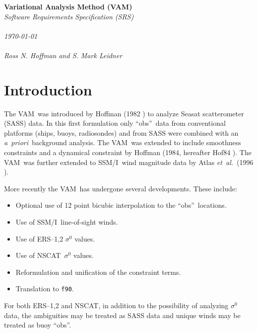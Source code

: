 \documentclass[11pt]{article}
\newcommand{\apriori}{{\em a~priori}}
\newcommand{\computer}[1]{{\tt #1}}
\newcommand{\ers}[1]{ERS--{#1}}
\newcommand{\etal}{{\em et~al.}}
\newcommand{\nscat}{NSCAT}
\newcommand{\obs}{``obs''}
\newcommand{\ssmi}{SSM/I}
\newcommand{\s}[1]{\mbox{$ \sigma^{#1} $}}
\newcommand{\vam}{VAM}
\newcommand{\xx}[1]{\section {#1}}
\newcommand{\reference}[2]{(#1 \cite{#2})}
\renewcommand{\apriori}{{\em a~priori}}
\begin{document}
\begin{center}
	      {\bf Variational Analysis Method (VAM)\\}
	   {\it Software Requirements Specification (SRS)\\ ~ \\
			       \today \\ ~ \\
	       Ross N. Hoffman and S. Mark Leidner\\ }
			     \vspace{2cm}
\end{center}

\xx {Introduction}

The \vam\ was introduced by Hoffman \reference{1982}{Hof82} to analyze
Seasat scatterometer (SASS) data.  In this first formulation only
\obs\ data from conventional platforms (ships, buoys, radiosondes) and
from SASS were combined with an \apriori\ background analysis.  The
\vam\ was extended to include smoothness constraints and a dynamical
constraint by Hoffman \reference{1984, hereafter Hof84}{Hof84}.  The
\vam\ was further extended to \ssmi\ wind magnitude data by Atlas \etal\
\reference{1996}{AtlHB+96}.

More recently the \vam\ has undergone several developments.  These
include:
 \begin{itemize}
  \item Optional use of 12 point bicubic interpolation to the \obs\ locations.
  \item Use of \ssmi\ line-of-sight winds.
  \item Use of \ers1,2 \s0 values.
  \item Use of \nscat\ \s0 values.
  \item Reformulation and unification of the constraint terms.
  \item Translation to \computer{f90}.
 \end{itemize}
 For both \ers1,2 and \nscat, in addition to the possibility of
analyzing \s0 data, the ambiguities may be treated as SASS data and
unique winds may be treated as buoy \obs.
\end{document}

